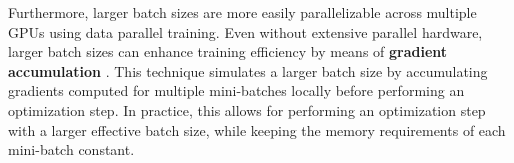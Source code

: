 Furthermore, larger batch sizes are more easily parallelizable across multiple
GPUs using data parallel training. Even without extensive parallel hardware,
larger batch sizes can enhance training efficiency by means of \textbf{gradient
accumulation} \cite{keskar2017large, ott2018scaling}. This technique simulates a
larger batch size by accumulating gradients computed for multiple mini-batches
locally before performing an optimization step. In practice, this allows for
performing an optimization step with a larger effective batch size, while
keeping the memory requirements of each mini-batch constant.
